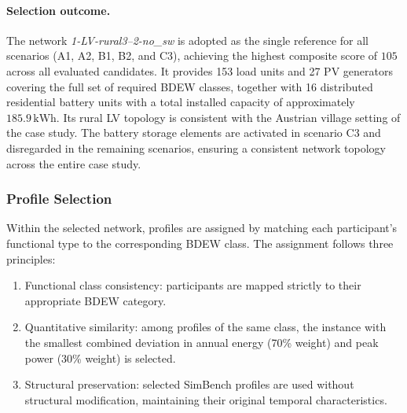 \paragraph{Selection outcome.}
The network \textit{1-LV-rural3--2-no\_sw} is adopted as the single reference for all scenarios (A1, A2, B1, B2, and C3), achieving the highest composite score of $105$ across all evaluated candidates. It provides 153 load units and 27 PV generators covering the full set of required BDEW classes, together with 16 distributed residential battery units with a total installed capacity of approximately $185.9\,\mathrm{kWh}$. Its rural LV topology is consistent with the Austrian village setting of the case study. The battery storage elements are activated in scenario C3 and disregarded in the remaining scenarios, ensuring a consistent network topology across the entire case study.



\subsubsection*{Profile Selection}

Within the selected network, profiles are assigned by matching each participant's functional type to the corresponding BDEW class. The assignment follows three principles:

\begin{enumerate}
    \item Functional class consistency: participants are mapped strictly to their appropriate BDEW category.
    \item Quantitative similarity: among profiles of the same class, the instance with the smallest combined deviation in annual energy (70\% weight) and peak power (30\% weight) is selected.
    \item Structural preservation: selected SimBench profiles are used without structural modification, maintaining their original temporal characteristics.
\end{enumerate}
